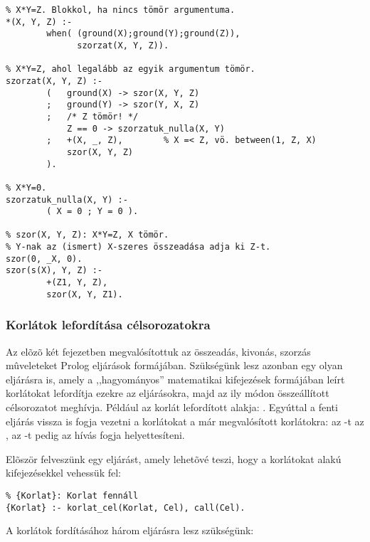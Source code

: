 \begin{verbatim}
% X*Y=Z. Blokkol, ha nincs tömör argumentuma.
*(X, Y, Z) :-
        when( (ground(X);ground(Y);ground(Z)),
              szorzat(X, Y, Z)).

% X*Y=Z, ahol legalább az egyik argumentum tömör.
szorzat(X, Y, Z) :-
        (   ground(X) -> szor(X, Y, Z)
        ;   ground(Y) -> szor(Y, X, Z)
        ;   /* Z tömör! */
            Z == 0 -> szorzatuk_nulla(X, Y)
        ;   +(X, _, Z),        % X =< Z, vö. between(1, Z, X)
            szor(X, Y, Z)
        ).

% X*Y=0.
szorzatuk_nulla(X, Y) :-
        ( X = 0 ; Y = 0 ).

% szor(X, Y, Z): X*Y=Z, X tömör.
% Y-nak az (ismert) X-szeres összeadása adja ki Z-t.
szor(0, _X, 0).
szor(s(X), Y, Z) :-
        +(Z1, Y, Z),
        szor(X, Y, Z1).
\end{verbatim}

\subsubsection{Korlátok lefordítása célsorozatokra}

Az elõzõ két fejezetben megvalósítottuk az összeadás, kivonás, szorzás
mûveleteket Prolog eljárások formájában. Szükségünk lesz azonban egy
olyan eljárásra is, amely a ,,hagyományos'' matematikai kifejezések
formájában leírt korlátokat lefordítja ezekre az eljárásokra, majd az ily
módon összeállított célsorozatot meghívja. Például az  korlát
lefordított alakja: . Egyúttal a fenti eljárás
vissza is fogja vezetni a \cd{=<, <, >=, >} korlátokat a már megvalósított
korlátokra: az -t az , az -t pedig az
 hívás fogja helyettesíteni.

Elõször felveszünk egy eljárást, amely lehetõvé teszi, hogy a korlátokat
 alakú kifejezésekkel vehessük fel:

\begin{verbatim}
% {Korlat}: Korlat fennáll
{Korlat} :- korlat_cel(Korlat, Cel), call(Cel).
\end{verbatim}

A korlátok fordításához három eljárásra lesz szükségünk:

